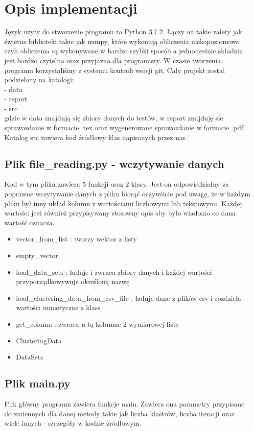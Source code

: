 \documentclass{classrep}
\begin{document}
\section{Opis implementacji}
{Język użyty do stworzenie programu to Python 3.7.2. Łączy on takie zalety jak świetne biblioteki takie jak numpy, które wykonują obliczenia niskopoziomowo czyli obliczenia są wykonywane w bardzo szybki sposób a jednocześnie składnia jest bardzo czytelna oraz przyjazna dla programisty. W czasie tworzenia programu korzystaliśmy z systemu kontroli wersji git. Cały projekt został podzielony na katalogi:\\
- data\\
- report\\
- src\\
gdzie w data znajdują się zbiory danych do testów, w report znajduję sie sprawozdanie w formacie .tex oraz wygenerowane sprawozdanie w formacie .pdf. Katalog src zawiera kod źródłowy klas napisanych przez nas.
	\subsection{Plik file\_reading.py - wczytywanie danych}
	{
		Kod w tym pliku zawiera 5 funkcji oraz 2 klasy. Jest on odpowiedziałny za poprawne wczytywanie danych z pliku biorąć oczywśicie pod uwagę, że w każdym pliku był inny układ kolumn z wartościami liczbowymi lub tekstowymi. Każdej wartości jest również przypisywany stosowny opis aby było wiadomo co dana wartość oznacza.
		\begin{itemize}
			\item vector\_from\_list : tworzy wektor z listy
			\item empty\_vector 
			\item load\_data\_sets : ładuje i zwraca zbiory danych i każdej wartości przyporządkowywuje określoną nazwę
			\item load\_clustering\_data\_from\_csv\_file : ładuje dane z plików csv i rozdziela wartości numeryczne z klass
			\item get\_column : zwraca n-tą kolumne 2 wymiarowej listy
			\item ClusteringData
			\item DataSets
		\end{itemize}
	}
	\subsection{Plik  main.py}
	{
		Plik główny programu zawiera funkcje main. Zawiera ona parametry przypisane do zmiennych dla danej metody takie jak liczba klastrów, liczba iteracji oraz wiele innych - szczegóły w kodzie źródłowym.
	}
}
\end{document}
